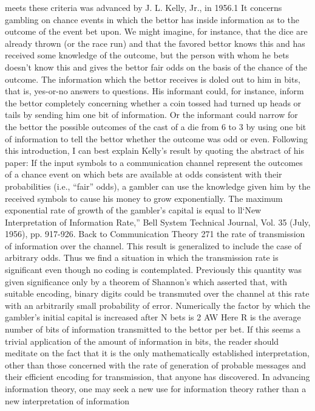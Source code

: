 {{{{{{{{{{{{meets these criteria was advanced by J. L. Kelly, Jr., in 1956.1 It
concerns gambling on chance events in which the bettor has inside
information as to the outcome of the event bet upon. We might
imagine, for instance, that the dice are already thrown (or the race
run) and that the favored bettor knows this and has received some
knowledge of the outcome, but the person with whom he bets
doesn’t know this and gives the bettor fair odds on the basis of
the chance of the outcome.
The information which the bettor receives is doled out to him
in bits, that is, yes-or-no answers to questions. His informant
could, for instance, inform the bettor completely concerning
whether a coin tossed had turned up heads or tails by sending him
one bit of information. Or the informant could narrow for the
bettor the possible outcomes of the cast of a die from 6 to 3 by
using one bit of information to tell the bettor whether the outcome
was odd or even.
Following this introduction, I can best explain Kelly’s result by
quoting the abstract of his paper:
If the input symbols to a communication channel represent the outcomes
of a chance event on which bets are available at odds consistent with their
probabilities (i.e., “fair” odds), a gambler can use the knowledge given him
by the received symbols to cause his money to grow exponentially. The
maximum exponential rate of growth of the gambler’s capital is equal to
ll‘New Interpretation of Information Rate,” Bell System Technical Journal, Vol.
35 (July, 1956), pp. 917-926.
Back to Communication Theory
271
the rate of transmission of information over the channel. This result is
generalized to include the case of arbitrary odds.
Thus we find a situation in which the transmission rate is significant even
though no coding is contemplated. Previously this quantity was given
significance only by a theorem of Shannon’s which asserted that, with
suitable encoding, binary digits could be transmuted over the channel at
this rate with an arbitrarily small probability of error.
Numerically the factor by which the gambler’s initial capital is
increased after N bets is
2 AW
Here R is the average number of bits of information transmitted
to the bettor per bet.
If this seems a trivial application of the amount of information
in bits, the reader should meditate on the fact that it is the only
mathematically established interpretation, other than those concerned
with the rate of generation of probable messages and their
efficient encoding for transmission, that anyone has discovered.
In advancing information theory, one may seek a new use for
information theory rather than a new interpretation of information
}}}}}}}}}}}}
